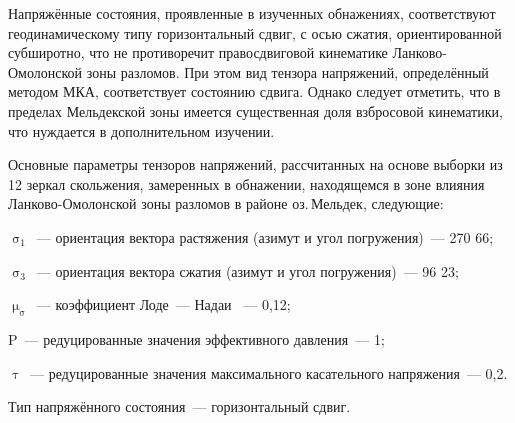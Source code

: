 
\clearpage
Напряжённые состояния, проявленные в изученных обнажениях, соответствуют
геодинамическому типу горизонтальный сдвиг, с осью сжатия, ориентированной
субширотно, что не противоречит правосдвиговой кинематике Ланково-Омолонской
зоны разломов. При этом вид тензора напряжений, определённый методом МКА,
соответствует состоянию сдвига. Однако следует отметить, что в пределах
Мельдекской зоны имеется существенная доля взбросовой кинематики, что нуждается
в дополнительном изучении.




Основные параметры тензоров напряжений, рассчитанных на основе выборки из 12 зеркал скольжения, замеренных в обнажении, находящемся в зоне влияния Ланково-Омолонской зоны разломов в районе оз.\,Мельдек, следующие:

\begin{description}[noitemsep]\vspace{-10pt}
\item $\upsigma_1$~--- ориентация вектора растяжения (азимут и угол погружения)~--- 270\dg\,\angl\,66;
\item $\upsigma_3$~--- ориентация вектора сжатия (азимут и угол погружения)~--- 96\dg\,\angl\,23;
\item $\upmu_\upsigma$~--- коэффициент Лоде~--- Надаи ~--- 0,12;
\item P~--- редуцированные значения эффективного давления~--- 1;
\item $\uptau$~--- редуцированные значения максимального касательного напряжения~--- 0,2.
\item Тип напряжённого состояния~--- горизонтальный сдвиг.
\end{description}



%


